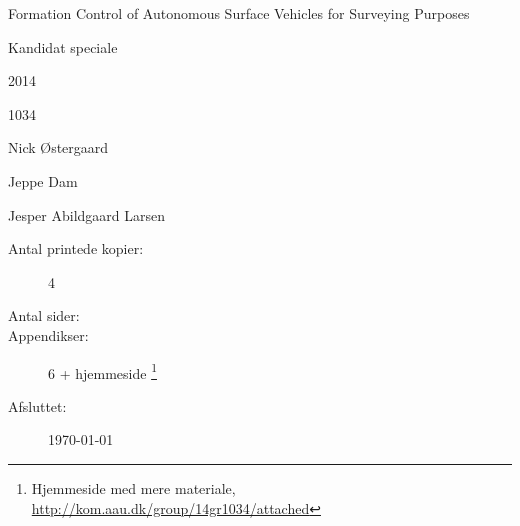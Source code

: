 \begin{minipage}[c]{0.45\textwidth}
	\begin{description}[leftmargin=\parindent+0.5em,labelindent=\parindent]
	\item [\textbf{Titel:}] \tightlist
	\item Formation Control of Autonomous Surface Vehicles for Surveying Purposes
	\end{description}

	\begin{description}
	\item [\textbf{Tema:}] \tightlist
	\item Kandidat speciale
	\end{description}

	\begin{description}
	\item[Projektperiode:] \tightlist
	\item 2014
	\end{description}
	\begin{description}
	\item[Projektgruppe:] \tightlist
	\item 1034
	\end{description}

	\begin{description}
	\item[Deltagere:] \tightlist
	\item Nick \O stergaard 
	\item Jeppe Dam
	\end{description} 

	\begin{description}
	\item[Vejleder:] \tightlist
	\item Jesper Abildgaard Larsen
	\end{description}

	\begin{description}
	\item[Antal printede kopier:] 4
	\item[Antal sider:] \arabic{lastsheet} 
	\item[Appendikser:] 6 + hjemmeside
		\footnote{Hjemmeside med mere materiale, \url{http://kom.aau.dk/group/14gr1034/attached}}
	\item[Afsluttet:] \today
	\end{description}
\end{minipage}
